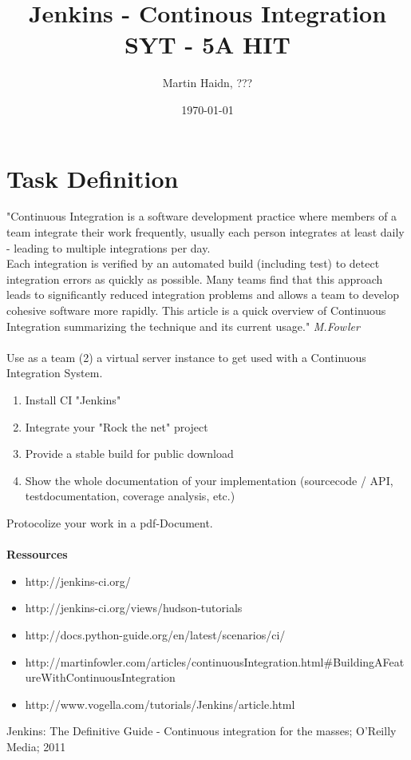 \documentclass[a4paper]{article}
\author{Martin Haidn, ???}
\title{Jenkins - Continous Integration\\SYT - 5A HIT}
\date{\today}
\begin{document}
	\large
	\maketitle
	
	\newpage
	\tableofcontents
	\newpage
	\section{Task Definition}
	"Continuous Integration is a software development practice where members of a team integrate their work frequently, usually each person integrates at least daily - leading to multiple integrations per day.\\
	Each integration is verified by an automated build (including test) to detect integration errors as quickly as possible. Many teams find that this approach leads to significantly reduced integration problems and allows a team to develop cohesive software more rapidly. This article is a quick overview of Continuous Integration summarizing the technique and its current usage." \textit{M.Fowler}\\
	\\
	Use as a team (2) a virtual server instance to get used with a Continuous Integration System.
	\begin{enumerate}
		\item Install CI "Jenkins"
		\item Integrate your "Rock the net" project
		\item Provide a stable build for public download
		\item Show the whole documentation of your implementation (sourcecode / API, testdocumentation, coverage analysis, etc.)
	\end{enumerate}
	Protocolize your work in a pdf-Document.\\
	\\
	\textbf{Ressources}
	\begin{itemize}
		\item http://jenkins-ci.org/
		\item http://jenkins-ci.org/views/hudson-tutorials
		\item http://docs.python-guide.org/en/latest/scenarios/ci/
		\item http://martinfowler.com/articles/continuousIntegration.html\#BuildingAFeatureWithContinuousIntegration
		\item http://www.vogella.com/tutorials/Jenkins/article.html\\
	\end{itemize}
	Jenkins: The Definitive Guide - Continuous integration for the masses; O'Reilly Media; 2011
		
\end{document}
